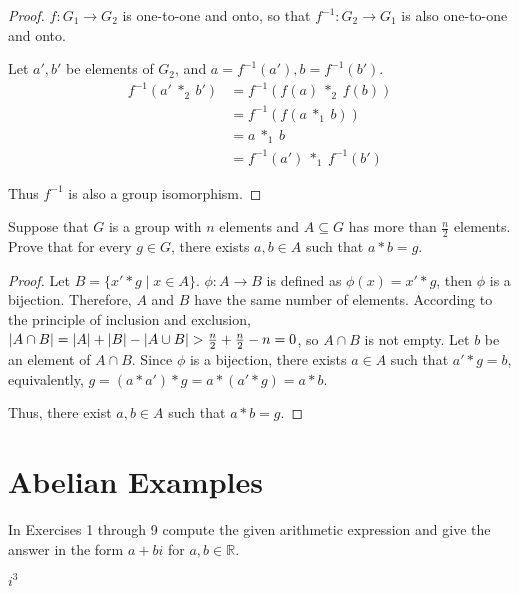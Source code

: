 \begin{proof}
    $f: G_{1} \to G_{2}$ is one-to-one and onto, so that $f^{-1}: G_{2} \to G_{1}$ is also one-to-one and onto.

    Let $a', b'$ be elements of $G_{2}$, and $a = f^{-1}(a'), b = f^{-1}(b')$.
    \begin{align*}
        f^{-1}(a'\ {*}_{2}\ b') & = f^{-1}(f(a)\ {*}_{2}\ f(b))     \\
                                & = f^{-1}(f(a\ {*}_{1}\ b))        \\
                                & = a\ {*}_{1}\ b                   \\
                                & = f^{-1}(a')\ {*}_{1}\ f^{-1}(b')
    \end{align*}

    Thus $f^{-1}$ is also a group isomorphism.
\end{proof}

\newpage
\begin{exercise}
    Suppose that $G$ is a group with $n$ elements and $A\subseteq G$ has more than $\frac{n}{2}$ elements. Prove that for every $g\in G$, there exists $a, b\in A$ such that $a * b = g$.
\end{exercise}

\begin{proof}
    Let $B = \{ x' * g \mid x\in A \}$. $\phi: A\to B$ is defined as $\phi(x) = x' * g$, then $\phi$ is a bijection. Therefore, $A$ and $B$ have the same number of elements. According to the principle of inclusion and exclusion, $\left\vert{A\cap B}\right\vert = \left\vert{A}\right\vert + \left\vert{B}\right\vert - \left\vert{A\cup B}\right\vert > \frac{n}{2} + \frac{n}{2} - n = 0$, so $A\cap B$ is not empty. Let $b$ be an element of $A\cap B$. Since $\phi$ is a bijection, there exists $a\in A$ such that $a' * g = b$, equivalently, $g = (a * a') * g = a * (a' * g) = a * b$.

    Thus, there exist $a, b\in A$ such that $a * b = g$.
\end{proof}

\newpage
\section{Abelian Examples}

\setcounter{exercise}{0}

In Exercises 1 through 9 compute the given arithmetic expression and give the answer in the form $a + bi$ for $a, b\in \mathbb{R}$.

\newpage
\begin{exercise}
    $i^{3}$
\end{exercise}

